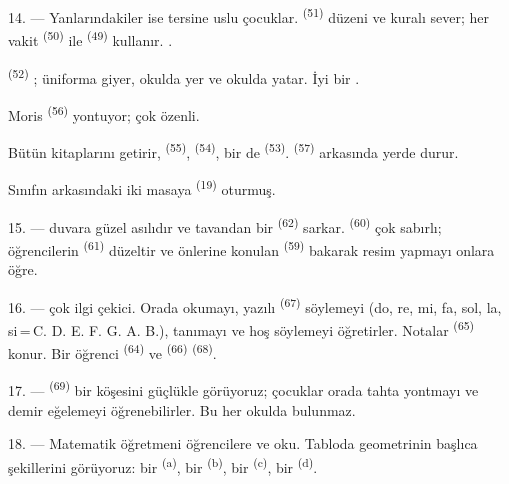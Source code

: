 14. --- Yanlarındakiler ise tersine uslu çocuklar. 
\textsuperscript{(51)} düzeni ve kuralı sever; her vakit 
\textsuperscript{(50)} ile  \textsuperscript{(49)}
kullanır. .

 \textsuperscript{(52)} ; üniforma
giyer, okulda yer ve okulda yatar. İyi bir .

Moris  \textsuperscript{(56)} 
yontuyor; çok özenli.

Bütün kitaplarını getirir,  \textsuperscript{(55)},
 \textsuperscript{(54)}, bir de 
\textsuperscript{(53)}.  \textsuperscript{(57)} arkasında yerde
durur.

Sınıfın arkasındaki iki masaya  \textsuperscript{(19)}
oturmuş.

\VUsaut{4.6mm}
\VUsaut{3.4mm}

15. ---  duvara güzel  asılıdır ve
tavandan  bir  \textsuperscript{(62)} sarkar.
 \textsuperscript{(60)} çok sabırlı; öğrencilerin
 \textsuperscript{(61)} düzeltir ve önlerine konulan
 \textsuperscript{(59)} bakarak resim yapmayı onlara öğre.

16. ---  çok ilgi çekici. Orada  okumayı,
 yazılı  \textsuperscript{(67)} söylemeyi (do,
re, mi, fa, sol, la, si\,=\,C. D. E. F. G. A. B.), 
tanımayı ve hoş  söylemeyi öğretirler. Notalar  \textsuperscript{(65)} konur. Bir öğrenci 
\textsuperscript{(64)} ve  \textsuperscript{(66)}
 \textsuperscript{(68)}.

17. ---  \textsuperscript{(69)}  bir
köşesini güçlükle görüyoruz; çocuklar orada tahta yontmayı ve demir eğelemeyi
öğrenebilirler. Bu her okulda bulunmaz.

\VUsaut{5.0mm}
\VUsaut{3.6mm}

18. --- Matematik öğretmeni öğrencilere  ve
 oku. Tabloda geometrinin başlıca şekillerini
görüyoruz: bir  \textsuperscript{(a)}, bir 
\textsuperscript{(b)}, bir  \textsuperscript{(c)}, bir
 \textsuperscript{(d)}.

